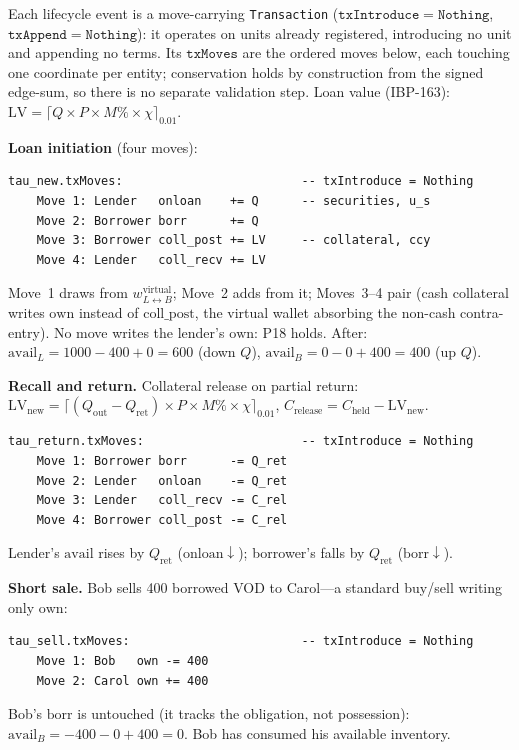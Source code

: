 \documentclass[11pt,a4paper]{article}
\begin{document}
Each lifecycle event is a move-carrying \texttt{Transaction} ($\mathtt{txIntroduce}=\texttt{Nothing}$, $\mathtt{txAppend}=\texttt{Nothing}$): it operates on units already registered, introducing no unit and appending no terms. Its $\mathtt{txMoves}$ are the ordered moves below, each touching one coordinate per entity; conservation holds by construction from the signed edge-sum, so there is no separate validation step. Loan value (IBP-163): $\mathrm{LV} = \lceil Q\times P\times M\%\times\chi \rceil_{0.01}$.

\noindent\textbf{Loan initiation} (four moves):
\begin{lstlisting}
tau_new.txMoves:                         -- txIntroduce = Nothing
    Move 1: Lender   onloan    += Q      -- securities, u_s
    Move 2: Borrower borr      += Q
    Move 3: Borrower coll_post += LV     -- collateral, ccy
    Move 4: Lender   coll_recv += LV
\end{lstlisting}
Move~1 draws from $w^{\mathrm{virtual}}_{L\leftrightarrow B}$; Move~2 adds from it; Moves~3--4 pair (cash collateral writes $\mathrm{own}$ instead of $\mathrm{coll\_post}$, the virtual wallet absorbing the non-cash contra-entry). No move writes the lender's $\mathrm{own}$: P18 holds. After: $\mathrm{avail}_L = 1000-400+0 = 600$ (down $Q$), $\mathrm{avail}_B = 0-0+400 = 400$ (up $Q$).

\noindent\textbf{Recall and return.} Collateral release on partial return: $\mathrm{LV}_{\mathrm{new}} = \lceil (Q_{\mathrm{out}}-Q_{\mathrm{ret}})\times P\times M\%\times\chi\rceil_{0.01}$, $C_{\mathrm{release}} = C_{\mathrm{held}}-\mathrm{LV}_{\mathrm{new}}$.
\begin{lstlisting}
tau_return.txMoves:                      -- txIntroduce = Nothing
    Move 1: Borrower borr      -= Q_ret
    Move 2: Lender   onloan    -= Q_ret
    Move 3: Lender   coll_recv -= C_rel
    Move 4: Borrower coll_post -= C_rel
\end{lstlisting}
Lender's $\mathrm{avail}$ rises by $Q_{\mathrm{ret}}$ ($\mathrm{onloan}\downarrow$); borrower's falls by $Q_{\mathrm{ret}}$ ($\mathrm{borr}\downarrow$).

\noindent\textbf{Short sale.} Bob sells 400 borrowed VOD to Carol---a standard buy/sell writing only $\mathrm{own}$:
\begin{lstlisting}
tau_sell.txMoves:                        -- txIntroduce = Nothing
    Move 1: Bob   own -= 400
    Move 2: Carol own += 400
\end{lstlisting}
Bob's $\mathrm{borr}$ is untouched (it tracks the obligation, not possession): $\mathrm{avail}_B = -400-0+400 = 0$. Bob has consumed his available inventory.
\end{document}
